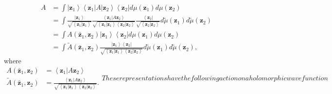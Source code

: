 \documentclass[aps,preprint]{revtex4}%
\begin{document}
\begin{align}
A &  =\int\left\vert \mathbf{z}_{1}\right\rangle \left\langle \mathbf{z}%
_{1}\right\vert A\left\vert \mathbf{z}_{2}\right\rangle \left\langle
\mathbf{z}_{2}\right\vert d\mu\left(  \mathbf{z}_{1}\right)  d\mu\left(
\mathbf{z}_{2}\right)  \nonumber\\
&  =\int\frac{\left\vert \mathbf{z}_{1}\right\rangle }{\sqrt{\left\langle
\mathbf{z}_{1}\left\vert \mathbf{z}_{1}\right.  \right\rangle }}%
\frac{\left\langle \mathbf{z}_{1}\left\vert A\mathbf{z}_{2}\right.
\right\rangle }{\sqrt{\left\langle \mathbf{z}_{1}\left\vert \mathbf{z}%
_{1}\right.  \right\rangle \left\langle \mathbf{z}_{2}\left\vert
\mathbf{z}_{2}\right.  \right\rangle }}\frac{\left\langle \mathbf{z}%
_{2}\right\vert }{\sqrt{\left\langle \mathbf{z}_{2}\left\vert \mathbf{z}%
_{2}\right.  \right\rangle }}d\tilde{\mu}\left(  \mathbf{z}_{1}\right)
d\tilde{\mu}\left(  \mathbf{z}_{2}\right)  \nonumber\\
&  =\int A\left(  \mathbf{\bar{z}}_{1},\mathbf{z}_{2}\right)  \left\vert
\mathbf{z}_{1}\right\rangle \left\langle \mathbf{z}_{2}\right\vert d\mu\left(
\mathbf{z}_{1}\right)  d\mu\left(  \mathbf{z}_{2}\right)  \nonumber\\
&  =\int\tilde{A}\left(  \mathbf{\bar{z}}_{1},\mathbf{z}_{2}\right)
\frac{\left\vert \mathbf{z}_{1}\right\rangle \left\langle \mathbf{z}%
_{2}\right\vert }{\sqrt{\left\langle \mathbf{z}_{1}\left\vert \mathbf{z}%
_{1}\right.  \right\rangle \left\langle \mathbf{z}_{2}\left\vert
\mathbf{z}_{2}\right.  \right\rangle }}d\tilde{\mu}\left(  \mathbf{z}%
_{1}\right)  d\tilde{\mu}\left(  \mathbf{z}_{2}\right)  ,
\end{align}
where
\begin{subequations}
\label{Q-Symbols}%
\begin{align}
A\left(  \mathbf{\bar{z}}_{1},\mathbf{z}_{2}\right)   &  =\left\langle
\mathbf{z}_{1}\left\vert A\mathbf{z}_{2}\right.  \right\rangle \nonumber\\
\tilde{A}\left(  \mathbf{\bar{z}}_{1},\mathbf{z}_{2}\right)   &
=\frac{\left\langle \mathbf{z}_{1}\left\vert A\mathbf{z}_{2}\right.
\right\rangle }{\sqrt{\left\langle \mathbf{z}_{1}\left\vert \mathbf{z}%
_{1}\right.  \right\rangle \left\langle \mathbf{z}_{2}\left\vert
\mathbf{z}_{2}\right.  \right\rangle }}.
\end{align}
These representations have the following action on a holomorphic wavefunction
\end{subequations}
\end{document}
